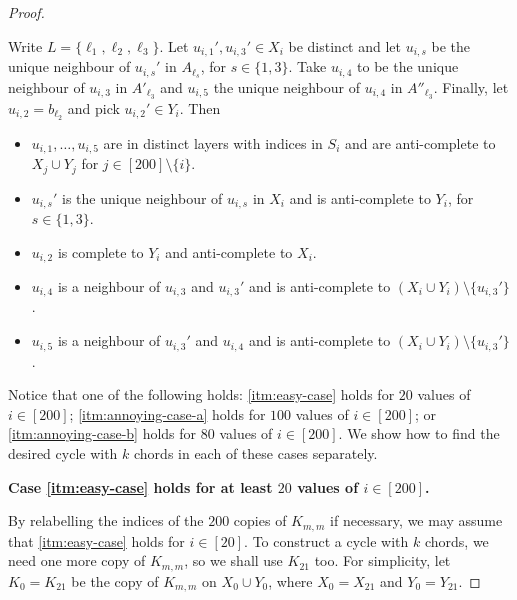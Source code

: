 \documentclass[10pt,a4paper]{amsart}
\theoremstyle{plain}
\theoremstyle{definition}
\begin{document}
\begin{proof}
\begin{enumerate} [label = \rm(\arabic*)]
				Write $L = \{\ell_1, \ell_2, \ell_3\}$.
				Let $u_{i,1}', u_{i,3}' \in X_i$ be distinct and let $u_{i,s}$ be the unique neighbour of $u_{i,s}'$ in $A_{\ell_s}$, for $s \in \{1,3\}$. Take $u_{i,4}$ to be the unique neighbour of $u_{i,3}$ in $A'_{\ell_3}$ and $u_{i,5}$ the unique neighbour of $u_{i,4}$ in $A''_{\ell_3}$. Finally, let $u_{i,2} = b_{\ell_2}$ and pick $u_{i,2}' \in Y_i$.
				Then
                \begin{itemize}
                    \item
						$u_{i, 1}, \ldots, u_{i, 5}$ are in distinct layers with indices in $S_i$ and are anti-complete to $X_j \cup Y_j$ for $j \in [200] \setminus \{i\}$.
                    \item 
						$u_{i,s}'$ is the unique neighbour of $u_{i,s}$ in $X_i$ and is anti-complete to $Y_i$, for $s \in \{1,3\}$.
                    \item
                        $u_{i, 2}$ is complete to $Y_i$ and anti-complete to $X_i$. 
                    \item
                        $u_{i, 4}$ is a neighbour of $u_{i, 3}$ and $u_{i, 3}'$ and is anti-complete to $(X_i \cup Y_i) \setminus \{u_{i, 3}'\}$.
                    \item
                        $u_{i, 5}$ is a neighbour of $u_{i, 3}'$ and $u_{i, 4}$ and is anti-complete to $(X_i \cup Y_i) \setminus \{u_{i, 3}'\}$.
                \end{itemize}
        \end{enumerate}
        Notice that one of the following holds: \ref{itm:easy-case} holds for $20$ values of $i \in [200]$; \ref{itm:annoying-case-a} holds for $100$ values of $i \in [200]$; or \ref{itm:annoying-case-b} holds for $80$ values of $i \in [200]$.
		We show how to find the desired cycle with $k$ chords in each of these cases separately.
        
        \medskip
        
        \textbf{Case \ref{itm:easy-case} holds for at least $20$ values of $i \in [200]$.}
        
        By relabelling the indices of the $200$ copies of $K_{m,m}$ if necessary, we may assume that \ref{itm:easy-case} holds for $i \in [20]$. To construct a cycle with $k$ chords, we need one more copy of $K_{m,m}$, so we shall use $K_{21}$ too. For simplicity, let $K_0=K_{21}$ be the copy of $K_{m,m}$ on $X_0\cup Y_0$, where $X_0=X_{21}$ and $Y_0=Y_{21}$.
        

\end{proof}
\end{document}
